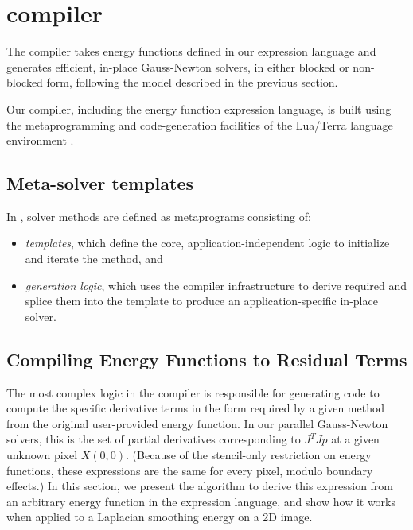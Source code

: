 \section{compiler}
\label{sec:compiler}


The \OPT compiler takes energy functions defined in our expression language and generates efficient, in-place Gauss-Newton solvers, in either blocked or non-blocked form, following the model described in the previous section.

Our compiler, including the energy function expression language, is built using the metaprogramming and code-generation facilities of the Lua/Terra language environment \cite{terra}.

\subsection{Meta-solver templates} %
\label{sub:solver_templates}
In \OPT, solver methods are defined as metaprograms consisting of:

\begin{itemize}
  \item \emph{templates}, which define the core, application-independent logic to initialize and iterate the method, and
  \item \emph{generation logic}, which uses the compiler infrastructure to derive required and splice them into the template to produce an application-specific in-place solver.
\end{itemize}


\subsection{Compiling Energy Functions to Residual Terms} %
\label{sec:jtj_generation}

The most complex logic in the compiler is responsible for generating code to compute the specific derivative terms in the form required by a given method from the original user-provided energy function.
In our parallel Gauss-Newton solvers, this is the set of partial derivatives corresponding to $J^TJp$ at a given unknown pixel $X(0,0)$. (Because of the stencil-only restriction on energy functions, these expressions are the same for every pixel, modulo boundary effects.)
In this section, we present the algorithm to derive this expression from an arbitrary energy function in the \OPT expression language, and show how it works when applied to a Laplacian smoothing energy on a 2D image.


